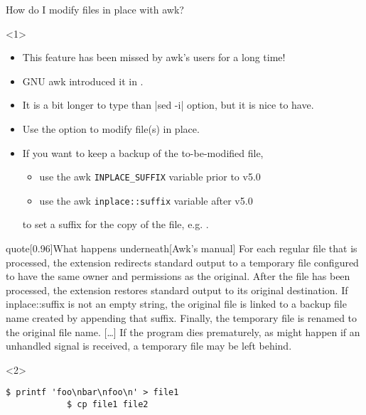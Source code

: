 \begin{frame}[fragile]{How do I modify files in place with awk?}
    \vspace{-3mm}
    \begin{onlyenv}<1>
        \begin{itemize}
            \item This feature has been missed by awk's users for a long time!
            \item GNU awk introduced it in .
            \item It is a bit longer to type than \;\bash|sed -i|\; option, but it is nice to have.
            \item Use the \;\; option to modify file(s) in place.
            \item If you want to keep a backup of the to-be-modified file,
                  \begin{itemize}
                      \item use the awk \texttt{INPLACE\_SUFFIX} variable prior to v5.0
                      \item use the awk \texttt{inplace::suffix} variable after v5.0
                  \end{itemize}
                  to set a suffix for the copy of the file, e.g. .
        \end{itemize}
        \begin{varblock}{quote}[0.96\textwidth]{What happens underneath}[Awk's manual]
            For each regular file that is processed, the extension redirects standard output to a temporary file configured to have the same owner and permissions as the original.
            After the file has been processed, the extension restores standard output to its original destination.
            If inplace::suffix is not an empty string, the original file is linked to a backup file name created by appending that suffix.
            Finally, the temporary file is renamed to the original file name.
            [\ldots]
            If the program dies prematurely, as might happen if an unhandled signal is received, a temporary file may be left behind.
        \end{varblock}
    \end{onlyenv}
    \begin{onlyenv}<2>
        \begin{lstlisting}[style=myBash, numbers=none, aboveskip=2mm]
            $ printf 'foo\nbar\nfoo\n' > file1
            $ cp file1 file2

\end{lstlisting}
\end{onlyenv}
\end{frame}
